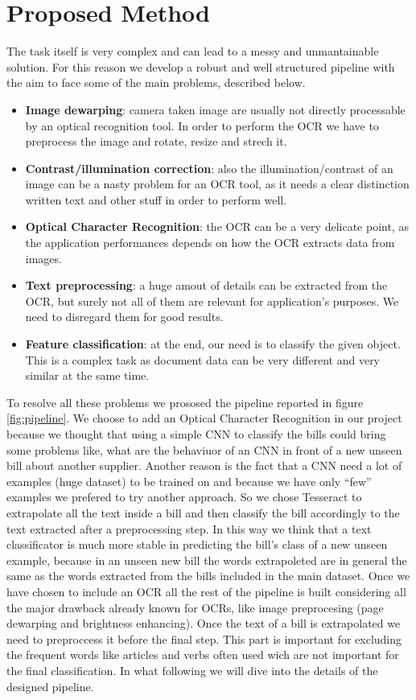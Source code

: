 \documentclass[10pt,twocolumn,letterpaper]{article}
\begin{document}
\section{Proposed Method}
\label{sec:proposed-method}

The task itself is very complex and can lead to a messy and
unmantainable solution. For this reason we develop a robust and well
structured pipeline with the aim to face some of the main problems,
described below.

\begin{itemize}
  \item \textbf{Image dewarping}: camera taken image are usually not directly
    processable by an optical recognition tool. In order to perform
    the OCR we have to preprocess the image and rotate, resize and
    strech it.
  \item \textbf{Contrast/illumination correction}: also the
    illumination/contrast of an image can be a nasty problem for an
    OCR tool, as it needs a clear distinction written text and other
    stuff in order to perform well.
  \item \textbf{Optical Character Recognition}: the OCR can be a very delicate
    point, as the application performances depends on how the OCR
    extracts data from images.
  \item \textbf{Text preprocessing}: a huge amout of details can be extracted
    from the OCR, but surely not all of them are relevant for
    application's purposes. We need to disregard them for good results.
  \item \textbf{Feature classification}: at the end, our need is to classify
    the given object. This is a complex task as document data can be
    very different and very similar at the same time.
\end{itemize}

To resolve all these problems we prososed the pipeline reported in
figure \ref{fig:pipeline}. We choose to add an Optical Character
Recognition in our project because we thought that using a simple CNN
to classify the bills could bring some problems like, what are the
behaviuor of an CNN in front of a new unseen bill about another
supplier. Another reason is the fact that a CNN need a lot of examples
(huge dataset) to be trained on and because we have only ``few''
examples we prefered to try another approach. So we chose Tesseract to
extrapolate all the text inside a bill and then classify the bill
accordingly to the text extracted after a preprocessing step. In this
way we think that a text classificator is much more stable in
predicting the bill's class of a new unseen example, because in an
unseen new bill the words extrapoleted are in general the same as the
words extracted from the bills included in the main dataset. Once we
have chosen to include an OCR all the rest of the pipeline is built
considering all the major drawback already known for OCRs, like image
preprocesing (page dewarping and brightness enhancing). Once the text
of a bill is extrapolated we need to preproccess it before the final
step. This part is important for excluding the frequent words like
articles and verbs often used wich are not important for the final
classification. In what following we will dive into the details of the
designed pipeline.
\end{document}
